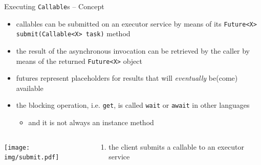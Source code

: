 \documentclass{beamer}\mode<presentation>{\usetheme{AMSBolognaFC}}
\begin{document}
\begin{frame}[c,allowframebreaks]{Executing \texttt{Callable}s -- Concept}

	

	\framebreak

	\begin{itemize}
		\item callables can be \alert{submitted} on an executor service by means of its \texttt{Future<X> submit(Callable<X> task)} method

		\vspace{.5cm}

		\item the result of the asynchronous invocation can be retrieved by the caller by means of the returned \texttt{Future<X>} object

		\vspace{.5cm}

		\item futures represent \alert{placeholders} for results that will \emph{eventually} be(come) available
	\end{itemize}

	\framebreak

	

	\begin{itemize}
		\item the blocking operation, i.e. \texttt{get}, is called \texttt{wait} or \texttt{\alert{await}} in other languages
		\begin{itemize}
			\item and it is not always an instance method
		\end{itemize}
	\end{itemize}

	\framebreak

	\begin{columns}
		\begin{column}{.6\linewidth}
			\begin{center}
				\texttt{[image: img/submit.pdf]}
			\end{center}
		\end{column}
		\begin{column}{.4\linewidth}
			\begin{enumerate}
				\item the client \alert{submits} a callable to an executor service


\end{enumerate}
\end{column}
\end{columns}
\end{frame}
\end{document}
